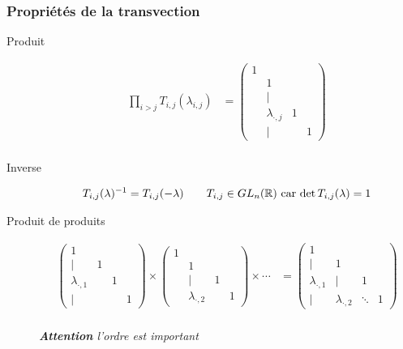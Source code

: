 \documentclass{article}
\begin{document}
\subsubsection{Propriétés de la transvection}
\begin{description}
    \item[] 
    \item[Produit] 
        \begin{align*}
            \prod_{i>j} T_{i, j}(\lambda_{i, j}  ) &= \begin{pmatrix} 1 \\ & 1 \\ & | \\ & \lambda_{ \cdot , j} & 1 \\ & | & &  1 \end{pmatrix}  \\
        \end{align*}
    \item[Inverse] \begin{align*}
            T_{i, j}(\lambda)^{-1} &= T_{i, j}(-\lambda) \quad&\text{$T_{i, j} \in GL_n(\mathbb{R})$ car $\operatorname{det} T_{i, j}(\lambda) = 1 $} \\
    \end{align*}
    \item[Produit de produits] 
        \begin{align*}
            \begin{pmatrix} 1 \\ | & 1 \\ \lambda_{ \cdot , 1} & & 1 \\ | & & & 1 \end{pmatrix}  \times 
            \begin{pmatrix} 1 \\ & 1 \\ & | &  1 \\ & \lambda_{ \cdot , 2} & & 1 \end{pmatrix}  \times \cdots &= \begin{pmatrix} 1 \\ | & 1  \\ \lambda_{ \cdot , 1} & | & 1 \\ | & \lambda_{ \cdot , 2} & \ddots & 1 \end{pmatrix}  \\
        \end{align*}

        \emph{{\bf Attention} l'ordre est important} 
\end{description}
\end{document}
